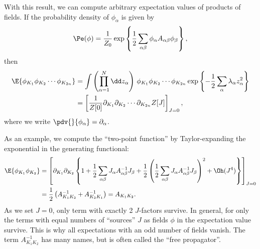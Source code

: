 With this result, we can compute arbitrary expectation values of products of fields.
If the probability density of $\phi_\alpha$ is given by
%
\begin{align}
    \Pe(\phi) = \frac{1}{Z_0} \exp \left\{ \frac{1}{2} \sum_{\alpha \beta} \phi_{\alpha} A_{\alpha \beta} \phi_\beta \right\},
\end{align}
%
then
%
\begin{align}
    \E{ \phi_{K_1} \phi_{K_2} \cdots \phi_{K_{2n}} }
    & = 
    \int \left( \prod_{\alpha=1}^N \dd z_\alpha \right)\, 
    \phi_{K_1} \phi_{K_2} \cdots \phi_{K_{2n}}
    \exp \left\{ - \frac{1}{2} \sum_{\alpha} \lambda_\alpha z_\alpha^2 \right\}\\
    & =
    \left[\frac{1}{Z[0]}\partial_{K_1} \partial_{K_2} \cdots \partial_{K_{2n}} Z[J]\right]_{J = 0},
\end{align}
%
where we write $\pdv{  }{ \phi_{\alpha} } = \partial_\alpha$.

As an example, we compute the ``two-point function'' by Taylor-expanding the exponential in the generating functional:
%
\begin{align}
    \E{\phi_{K_1} \phi_{K_2}} 
    &
    = 
    \left[
        \partial_{K_1} \partial_{K_2}
        \left\{
            1
            + \frac{1}{2}\sum_{\alpha \beta} J_\alpha A_{\alpha \beta}^{-1} J_\beta
            + \frac{ 1 }{ 2 } \left(\frac{1}{2}\sum_{\alpha \beta} J_\alpha A_{\alpha \beta}^{-1} J_\beta\right)^2
            + \Oh(J^4)
        \right\}
    \right]_{J = 0} \\
    & = \frac{1}{2}\left(  A_{K_1 K_2}^{-1} +  A_{K_2 K_1}^{-1} \right)
    = A_{K_1K_2}
    .
\end{align}
%
As we set $J = 0$, only term with exactly 2 $J$-factors survive.
In general, for only the terms with equal numbers of ``sources'' $J$ as fields $\phi$ in the expectation value survive.
This is why all expectations with an odd number of fields vanish.
The term $A_{K_1K_2}^{-1}$ has many names, but is often called the ``free propagator''.

